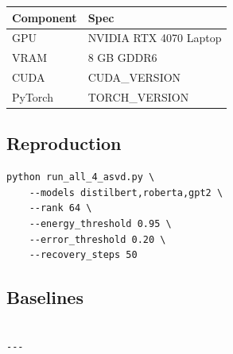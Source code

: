 \begin{table}[H]
\centering
\small
\begin{tabular}{ll}
\toprule
\textbf{Component} & \textbf{Spec} \\
\midrule
GPU & NVIDIA RTX 4070 Laptop \\
VRAM & 8 GB GDDR6 \\
CUDA & {{CUDA\_VERSION}} \\
PyTorch & {{TORCH\_VERSION}} \\
\bottomrule
\end{tabular}
\end{table}

\subsection{Reproduction}

\begin{lstlisting}
python run_all_4_asvd.py \
    --models distilbert,roberta,gpt2 \
    --rank 64 \
    --energy_threshold 0.95 \
    --error_threshold 0.20 \
    --recovery_steps 50
\end{lstlisting}

\subsection{Baselines}

\begin{lstlisting}

---
\end{lstlisting}